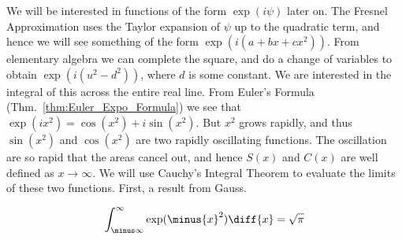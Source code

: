         We will be interested in functions
        of the form $\exp(i\psi)$ later on. The Fresnel
        Approximation uses the Taylor expansion of $\psi$
        up to the quadratic term, and hence we will see
        something of the form $\exp(i(a+bx+cx^2))$. From
        elementary algebra we can complete the square, and
        do a change of variables to obtain
        $\exp(i(u^{2}-d^{2}))$, where $d$ is some constant.
        We are interested in the integral of this across the
        entire real line. From Euler's Formula
        (Thm.~\ref{thm:Euler_Expo_Formula}) we
        see that $\exp(ix^{2})=\cos(x^{2})+i\sin(x^{2})$.
        But $x^{2}$ grows rapidly,
        and thus $\sin(x^{2})$ and $\cos(x^{2})$ are two
        rapidly oscillating functions. The oscillation are
        so rapid that the areas cancel out, and hence
        $S(x)$ and $C(x)$ are well defined as
        $x\rightarrow\infty$. We will use Cauchy's Integral
        Theorem to evaluate the limits of these two functions.
        First, a result from Gauss.
        \begin{theorem}
            \begin{equation}
                \int_{\minus\infty}^{\infty}
                    \exp(\minus{x}^{2})\diff{x}
                =\sqrt{\pi}
            \end{equation}
        \end{theorem}
